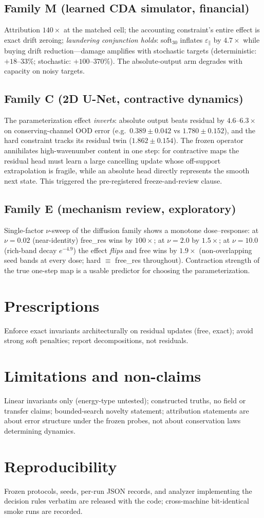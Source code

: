 \documentclass{article}
\newcommand{\cons}{\varepsilon_{\parallel}}
\begin{document}
\subsection{Family M (learned CDA simulator, financial)}
Attribution $140\times$ at the matched cell; the accounting constraint's entire effect is
exact drift zeroing; \emph{laundering conjunction holds}: soft$_{30}$ inflates $\cons$ by
$4.7\times$ while buying drift reduction---damage amplifies with stochastic targets
(deterministic: $+18$--$33\%$; stochastic: $+100$--$370\%$). The absolute-output arm degrades
with capacity on noisy targets.

\subsection{Family C (2D U-Net, contractive dynamics)}
The parameterization effect \emph{inverts}: absolute output beats residual by $4.6$--$6.3\times$
on conserving-channel OOD error (e.g.\ $0.389\pm0.042$ vs $1.780\pm0.152$), and the hard
constraint tracks its residual twin ($1.862\pm0.154$). The frozen operator annihilates
high-wavenumber content in one step: for contractive maps the residual head must learn a large
cancelling update whose off-support extrapolation is fragile, while an absolute head directly
represents the smooth next state. This triggered the pre-registered freeze-and-review clause.

\subsection{Family E (mechanism review, exploratory)}
Single-factor $\nu$-sweep of the diffusion family shows a monotone dose--response: at
$\nu=0.02$ (near-identity) free\_res wins by $100\times$; at $\nu=2.0$ by $1.5\times$; at
$\nu=10.0$ (rich-band decay $e^{-4.9}$) the effect \emph{flips} and free wins by $1.9\times$
(non-overlapping seed bands at every dose; hard $\equiv$ free\_res throughout). Contraction
strength of the true one-step map is a usable predictor for choosing the parameterization.

\section{Prescriptions}
Enforce exact invariants architecturally on residual updates (free, exact); avoid strong soft
penalties; report decompositions, not residuals.

\section{Limitations and non-claims}
Linear invariants only (energy-type untested); constructed truths, no field or transfer
claims; bounded-search novelty statement; attribution statements are about error structure
under the frozen probes, not about conservation laws determining dynamics.

\section{Reproducibility}
Frozen protocols, seeds, per-run JSON records, and analyzer implementing the decision rules
verbatim are released with the code; cross-machine bit-identical smoke runs are recorded.



\end{document}
